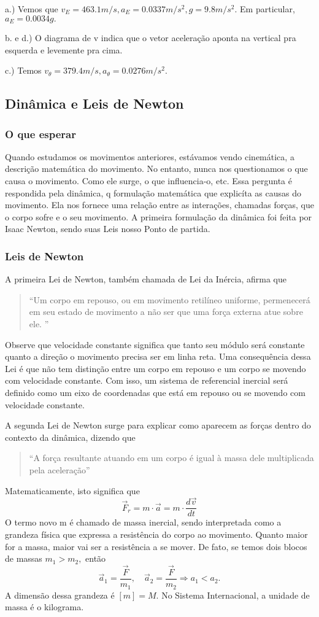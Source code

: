 \documentclass[PhysicsI/physics_notes.tex]{subfiles}
\begin{document}
a.) Vemos que $v_{E} = 463.1m/s, a_{E} = 0.0337m/s^{2}, g = 9.8m/s^{2}$. Em particular, $a_{E} = 0.0034g.$

b. e d.) O diagrama de v indica que o vetor aceleração aponta na vertical pra esquerda e levemente pra cima.

c.) Temos $v_{\theta} = 379.4m/s, a_{\theta}=0.0276m/s^{2}.$

\subsection{Dinâmica e Leis de Newton}
\subsubsection{O que esperar}
Quando estudamos os movimentos anteriores, estávamos vendo cinemática, a descrição matemática do movimento. No entanto,
nunca nos questionamos o que causa o movimento. Como ele surge, o que influencia-o, etc. Essa pergunta é respondida pela dinâmica,
q formulação matemática que explicíta as causas do movimento. Ela nos fornece uma relação entre as interações, chamadas forças,
que o corpo sofre e o seu movimento. A primeira formulação da dinâmica foi feita por Isaac Newton, sendo suas Leis nosso Ponto de partida.

\subsubsection{Leis de Newton}
A primeira Lei de Newton, também chamada de Lei da Inércia, afirma que
\begin{quote}
	``Um corpo em repouso, ou em movimento retilíneo uniforme, permenecerá em seu estado de movimento a não ser que uma
	força externa atue sobre ele. ''
\end{quote}
Observe que velocidade constante significa que tanto seu módulo será constante quanto a direção o movimento precisa ser em linha reta.
Uma consequência dessa Lei é que não tem distinção entre um corpo em repouso e um corpo se movendo com velocidade constante.
Com isso, um sistema de referencial inercial será definido como um eixo de coordenadas que está em repouso ou se movendo com
velocidade constante.

A segunda Lei de Newton surge para explicar como aparecem as forças dentro do contexto da dinâmica, dizendo que
\begin{quote}
	``A força resultante atuando em um corpo é igual à massa dele multiplicada pela aceleração''
\end{quote}
Matematicamente, isto significa que
$$
	\boxed{\vec{F}_{r} = m \cdot \vec{a} = m \cdot \frac{d \vec{v}}{dt}}
$$
O termo novo m é chamado de massa inercial, sendo interpretada como a grandeza física que expressa a resistência do corpo
ao movimento. Quanto maior for a massa, maior vai ser a resistência a se mover. De fato, se temos dois blocos de massas $m_{1}>m_{2},$ então
$$
	\vec{a}_{1} = \frac{\vec{F}}{m_{1}},\quad \vec{a}_{2} = \frac{\vec{F}}{m_{2}} \Rightarrow a_{1} < a_{2}.
$$
A dimensão dessa grandeza é $[m] = M$. No Sistema Internacional, a unidade de massa é o kilograma.
\end{document}

